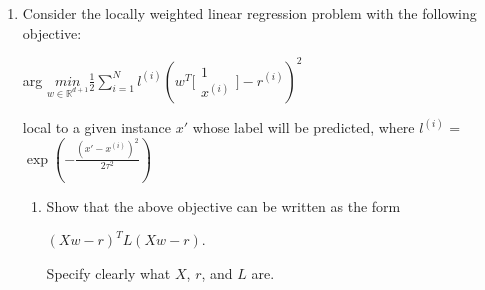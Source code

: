 \documentclass[12pt]{article}
\begin{document}
\begin {enumerate}
\begin {enumerate}
\begin {flushleft}
					\end {flushleft}
					\noindent\makebox[\linewidth]{\rule{\textwidth}{0.4pt}}
					
					
			\end {enumerate}
		
		\item Consider the locally weighted linear regression problem with the following objective:\\ 
			\begin{center}
				arg $\underset{w \in \mathbb{R}^{d+1}}{min} \frac{1}{2} \displaystyle\sum_{i=1}^Nl^{(i)}(w^T 
				\bigg[ \begin{array}{c}1 \\ x^{(i)}\end{array} \bigg] - r^{(i)})^2$
			\end{center} 
			local to a given instance $x'$ whose label will be predicted, where $l^{(i)}$ = 
			$\exp{(- \frac{(x' - x^{(i)})^2}{2 \tau^2})}$ 
			
			\begin {enumerate}
				\item Show that the above objective can be written as the form \\
					\begin {center} $(Xw-r)^TL(Xw-r)$. \end {center}	
					Specify clearly what $X$, $r$, and $L$ are.
					
					\noindent\makebox[\linewidth]{\rule{\textwidth}{0.4pt}}
					\begin {flushleft} %
					

\end{flushleft}
\end{enumerate}
\end{enumerate}
\end{document}
